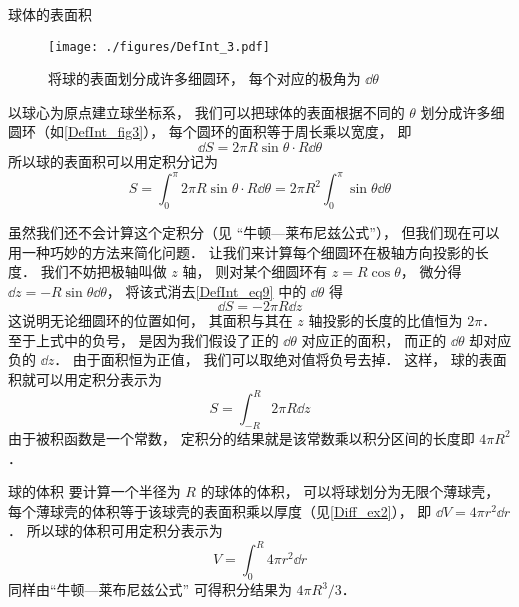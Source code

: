 \begin{example}{球体的表面积}\label{DefInt_ex3}

\begin{figure}[ht]
\centering
\texttt{[image: ./figures/DefInt\_3.pdf]}
\caption{将球的表面划分成许多细圆环， 每个对应的极角为 $\dd{\theta}$} \label{DefInt_fig3}
\end{figure}

以球心为原点建立球坐标系， 我们可以把球体的表面根据不同的 $\theta$ 划分成许多细圆环（如\autoref{DefInt_fig3}）， 每个圆环的面积等于周长乘以宽度， 即
\begin{equation}\label{DefInt_eq9}
\dd{S} = 2\pi R\sin\theta \cdot R\dd{\theta}
\end{equation}
所以球的表面积可以用定积分记为
\begin{equation}
S = \int_0^{\pi} 2\pi R\sin\theta \cdot R\dd{\theta} = 2\pi R^2 \int_0^{\pi} \sin\theta \dd{\theta}
\end{equation}

虽然我们还不会计算这个定积分（见 “牛顿—莱布尼兹公式”）， 但我们现在可以用一种巧妙的方法来简化问题． 让我们来计算每个细圆环在极轴方向投影的长度． 我们不妨把极轴叫做 $z$ 轴， 则对某个细圆环有 $z = R\cos\theta$， 微分得 $\dd{z} = -R\sin\theta \dd{\theta}$， 将该式消去\autoref{DefInt_eq9} 中的 $\dd{\theta}$ 得
\begin{equation}
\dd{S} = -2\pi R\dd{z}
\end{equation}
这说明无论细圆环的位置如何， 其面积与其在 $z$ 轴投影的长度的比值恒为 $2\pi$． 至于上式中的负号， 是因为我们假设了正的 $\dd{\theta}$ 对应正的面积， 而正的 $\dd{\theta}$ 却对应负的 $\dd{z}$． 由于面积恒为正值， 我们可以取绝对值将负号去掉． 这样， 球的表面积就可以用定积分表示为
\begin{equation}\label{DefInt_eq12}
S = \int_{-R}^{R} 2\pi R\dd{z}
\end{equation}
由于被积函数是一个常数， 定积分的结果就是该常数乘以积分区间的长度即 $4\pi R^2$．
\end{example}

\begin{example}{球的体积}\label{DefInt_ex4}
要计算一个半径为 $R$ 的球体的体积， 可以将球划分为无限个薄球壳， 每个薄球壳的体积等于该球壳的表面积乘以厚度（见\autoref{Diff_ex2}）， 即 $\dd{V} = 4\pi r^2 \dd{r}$． 所以球的体积可用定积分表示为
\begin{equation}
V = \int_0^R 4\pi r^2 \dd{r}
\end{equation}
同样由“牛顿—莱布尼兹公式” 可得积分结果为 $4\pi R^3/3$．
\end{example}
